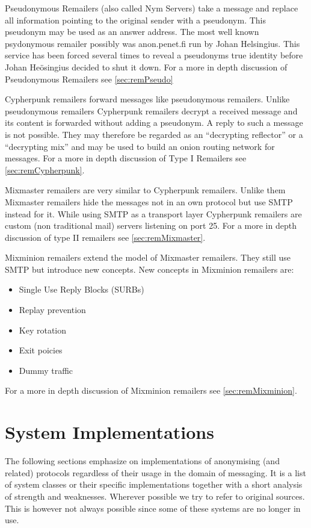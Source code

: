 Pseudonymous Remailers (also called Nym Servers) take a message and replace all information pointing to the original sender with a pseudonym. This pseudonym may be used as an answer address. The most well known psydonymous remailer possibly was anon.penet.fi run by Johan Helsingius. This service has been forced several times to reveal a pseudonyms true identity before Johan Heösingius decided to shut it down. For a more in depth discussion of Pseudonymous Remailers see \ref{sec:remPseudo}

Cypherpunk remailers forward messages like pseudonymous remailers. Unlike pseudonymous remailers Cypherpunk remailers decrypt a received message and its content is forwarded without adding a pseudonym. A reply to such a message is not possible. They may therefore be regarded as an ``decrypting reflector'' or a ``decrypting mix'' and may be used to build an onion routing network for messages. For a more in depth discussion of Type I Remailers see \ref{sec:remCypherpunk}.

Mixmaster remailers are very similar to Cypherpunk remailers. Unlike them Mixmaster remailers hide the messages not in an own protocol but use SMTP instead for it. While using SMTP as a transport layer Cypherpunk remailers are custom (non traditional mail) servers listening on port 25. For a more in depth discussion of type II remailers see \ref{sec:remMixmaster}.

Mixminion remailers extend the model of Mixmaster remailers. They still use SMTP but introduce new concepts. New concepts in Mixminion remailers are:
\begin{itemize}
	\item Single Use Reply Blocks (SURBs)
	\item Replay prevention
	\item Key rotation
	\item Exit poicies
	\item Dummy traffic
\end{itemize}
For a more in depth discussion of Mixminion remailers see \ref{sec:remMixminion}.


\section{System Implementations\label{sec:sysImpl}}
The following sections emphasize on implementations of anonymising (and related) protocols regardless of their usage in the domain of messaging. It is a list of system classes or their specific implementations together with a short analysis of strength and weaknesses. Wherever possible we try to refer to original sources. This is however not always possible since some of these systems are no longer in use.

